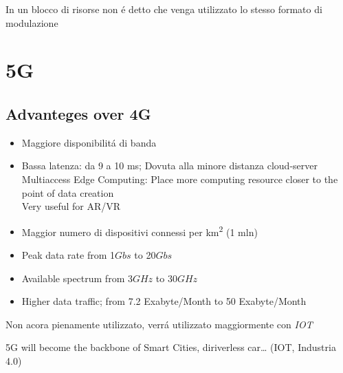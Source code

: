 \documentclass{article}
\begin{document}
In un blocco di risorse non \'e detto che venga utilizzato lo stesso formato di modulazione

\section{5G}

\subsection{Advanteges over 4G}

\begin{itemize}
    \item Maggiore disponibilit\'a di banda
    \item Bassa latenza: da 9 a 10 ms; Dovuta alla minore distanza cloud-server\\
        Multiaccess Edge Computing: Place more computing resource closer to the point of data creation\\
        Very useful for AR/VR

    \item Maggior numero di dispositivi connessi per km\textsuperscript{2} (1 mln)
    \item Peak data rate from 1\(Gbs\) to 20\(Gbs\)
    \item Available spectrum from 3\(GHz\) to 30\(GHz\)
    \item Higher data traffic; from 7.2 Exabyte/Month to 50 Exabyte/Month

\end{itemize}



Non acora pienamente utilizzato, verr\'a utilizzato maggiormente con \textit{IOT}


5G will become the backbone of Smart Cities, diriverless car… (IOT, Industria 4.0)
\end{document}

